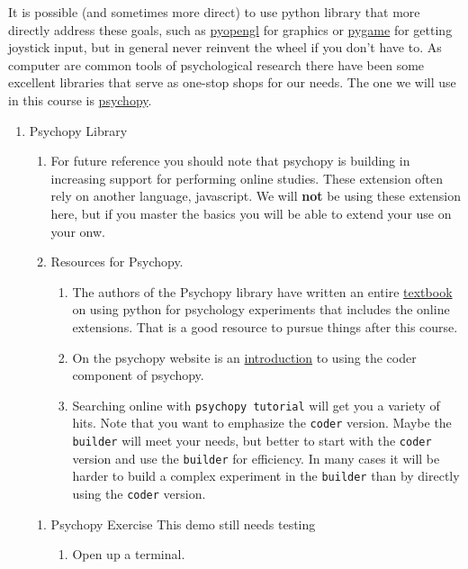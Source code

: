 \documentclass{article}
\begin{document}
It is possible (and sometimes more direct) to use python library that more directly address these goals, such as \href{http://pyopengl.sourceforge.net/}{pyopengl} for graphics or \href{https://www.pygame.org/news}{pygame} for getting joystick input, but in general never reinvent the wheel if you don't have to. As computer are common tools of psychological research there have been some excellent libraries that serve as one-stop shops for our needs. The one we will use in this course is \href{https://www.psychopy.org/}{psychopy}.
\begin{enumerate}
\item Psychopy Library
\label{sec:org40404c4}
\begin{enumerate}
\item For future reference you should note that psychopy is building in increasing support for performing online studies. These extension often rely on another language, javascript. We will \textbf{not} be using these extension here, but if you master the basics you will be able to extend your use on your onw.
\item Resources for Psychopy.
\begin{enumerate}
\item The authors of the Psychopy library have written an entire \href{https://us.sagepub.com/en-us/nam/building-experiments-in-psychopy/book253480\#contents}{textbook} on using python for psychology experiments that includes the online extensions. That is a good resource to pursue things after this course.
\item On the psychopy website is an \href{https://www.psychopy.org/coder/coder.html}{introduction} to using the coder component of psychopy.
\item Searching online with \texttt{psychopy tutorial} will get you a variety of hits. Note that you want to emphasize the \texttt{coder} version. Maybe the \texttt{builder} will meet your needs, but better to start with the \texttt{coder} version and use the \texttt{builder} for efficiency. In many cases it will be harder to build a complex experiment in the \texttt{builder} than by directly using the \texttt{coder} version.
\end{enumerate}
\end{enumerate}
\begin{enumerate}
\item Psychopy Exercise
\label{sec:orgc5135e5}
This demo still needs testing
\begin{enumerate}
\item Open up a terminal.

\end{enumerate}
\end{enumerate}
\end{enumerate}
\end{document}
